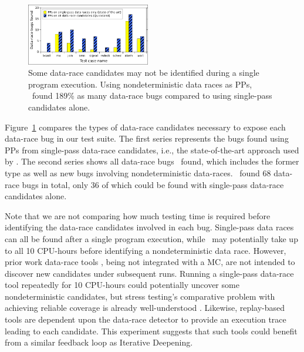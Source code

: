 \begin{figure}[t]
	\includegraphics[width=0.48\textwidth]{nondet-drs-1-v2.pdf}
	\caption{Some data-race candidates may not be identified during a single program execution.
		Using nondeterministic data races as PPs,
		\quicksand~found 189\% as many data-race bugs compared to using single-pass candidates alone.
	}
	\label{fig:dr-falsenegs}
\end{figure}
Figure~\ref{fig:dr-falsenegs} compares the types of data-race candidates necessary to expose each data-race bug in our test suite.
The first series represents the bugs found using PPs from single-pass data-race candidates,
i.e., the state-of-the-art approach used by \cite{racefuzzer,portend}.
The second series shows all data-race bugs \quicksand~found,
which includes the former type as well as new bugs involving nondeterministic data-races.
\quicksand~found 68 data-race bugs in total, only 36 of which could be found with single-pass data-race candidates alone.


Note that we are not comparing how much testing time is required before identifying the data-race candidates involved in each bug.
Single-pass data races can all be found after a single program execution,
while \quicksand~may potentially take up to all 10 CPU-hours before identifying a nondeterministic data race.
However, prior work data-race tools \cite{tsan}, being not integrated with a MC,
are not intended to discover new candidates under subsequent runs.
Running a single-pass data-race tool repeatedly for 10 CPU-hours could potentially uncover some nondeterministic candidates,
but stress testing's comparative problem with achieving reliable coverage is already well-understood
\cite{chess-icb,gambit}.
Likewise, replay-based tools \cite{portend} are dependent upon the data-race detector to provide an execution trace leading to each candidate.
This experiment suggests that
such tools could benefit from a similar feedback loop as Iterative Deepening.


